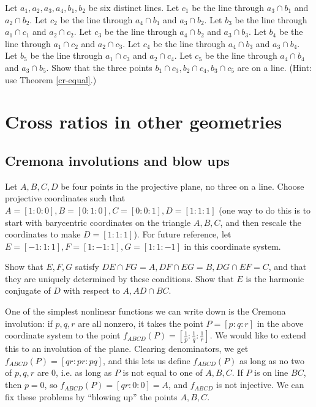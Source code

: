 \begin{exer} Let $a_1,a_2,a_3,a_4,b_1,b_2$ be six distinct lines. Let $c_1$ be the line through $a_3\cap b_1$ and $a_2\cap b_2$. Let $c_2$ be the line through $a_4\cap b_1$ and $a_3\cap b_2$. Let $b_3$ be the line through $a_1\cap c_1$ and $a_2\cap c_2$. Let $c_3$ be the line through $a_4\cap b_2$ and $a_3\cap b_3$. Let $b_4$ be the line through $a_1\cap c_2$ and $a_2\cap c_3$. Let $c_4$ be the line through $a_4\cap b_3$ and $a_3\cap b_4$. Let $b_5$ be the line through $a_1\cap c_3$ and $a_2\cap c_4$. Let $c_5$ be the line through $a_4\cap b_4$ and $a_3\cap b_5$. Show that the three points $b_1\cap c_3, b_2\cap c_4, b_3\cap c_5$ are on a line. (Hint: use Theorem \ref{cr-equal}.)
\end{exer}


\bigskip

\section{Cross ratios in other geometries}

\subsection{Cremona involutions and blow ups}

Let $A,B,C,D$ be four points in the projective plane, no three on a line. Choose projective coordinates such that $A = [1:0:0], B = [0:1:0], C = [0:0:1], D = [1:1:1]$ (one way to do this is to start with barycentric coordinates on the triangle $A,B,C$, and then rescale the coordinates to make $D = [1:1:1]$). For future reference, let $E = [-1:1:1], F = [1:-1:1], G = [1:1:-1]$ in this coordinate system.

\begin{exer} Show that $E,F,G$ satisfy $DE \cap FG = A, DF \cap EG = B, DG \cap EF = C$, and that they are uniquely determined by these conditions. Show that $E$ is the harmonic conjugate of $D$ with respect to $A, AD\cap BC$.
\end{exer}

One of the simplest nonlinear functions we can write down is the Cremona involution: if $p,q,r$ are all nonzero, it takes the point $P = [p:q:r]$ in the above coordinate system to the point $f_{ABCD}(P) = [\frac{1}{p}:\frac{1}{q}:\frac{1}{r}]$. We would like to extend this to an involution of the plane. Clearing denominators, we get $f_{ABCD}(P) = [qr:pr:pq]$, and this lets us define $f_{ABCD}(P)$ as long as no two of $p,q,r$ are $0$, i.e. as long as $P$ is not equal to one of $A,B,C$. If $P$ is on line $BC$, then $p=0$, so $f_{ABCD}(P) = [qr:0:0] = A$, and $f_{ABCD}$ is not injective. We can fix these problems by ``blowing up'' the points $A,B,C$.

